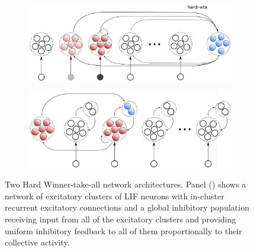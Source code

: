 \begin{figure}[t!]
\centering
\begin{subfigure}{.45\textwidth}
\centering
\includegraphics[width=\linewidth]{img/chapter3/hard_wta_global_inh.png}
\caption{}
\label{fig:hard_WTA_global_inh}
\end{subfigure}
\begin{subfigure}{.4\textwidth}
\centering
\includegraphics[width=\textwidth]{img/chapter3/hard_wta_global_exc.png}
\caption{}
\label{fig:hard_WTA_global_exc}
\end{subfigure}
\caption[Two Hard Winner-take-all network sketches]{Two Hard Winner-take-all network architectures. Panel () shows a network of excitatory clusters of LIF neurons with in-cluster recurrent excitatory connections and a global inhibitory population receiving input from all of the excitatory clusters and providing uniform inhibitory feedback to all of them proportionally to their collective activity. }
\label{fig:hard_wta_sketch}
\end{figure}

